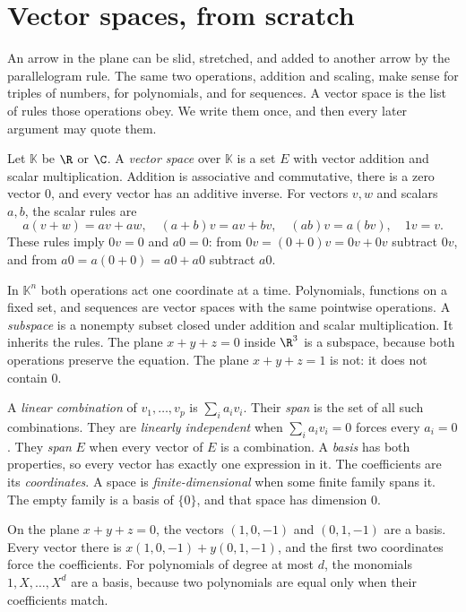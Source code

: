 \section{Vector spaces, from scratch}

An arrow in the plane can be slid, stretched, and added to another arrow by the parallelogram rule. The same two operations, addition and scaling, make sense for triples of numbers, for polynomials, and for sequences. A vector space is the list of rules those operations obey. We write them once, and then every later argument may quote them.

\begin{definitionx}
Let $\mathbb K$ be $\R$ or $\C$. A \emph{vector space} over $\mathbb K$ is a set $E$ with vector addition and scalar multiplication. Addition is associative and commutative, there is a zero vector $0$, and every vector has an additive inverse. For vectors $v,w$ and scalars $a,b$, the scalar rules are
\[
a(v+w)=av+aw,\quad (a+b)v=av+bv,\quad (ab)v=a(bv),\quad 1v=v.
\]
These rules imply $0v=0$ and $a0=0$: from $0v=(0+0)v=0v+0v$ subtract $0v$, and from $a0=a(0+0)=a0+a0$ subtract $a0$.
\end{definitionx}

In $\mathbb K^n$ both operations act one coordinate at a time. Polynomials, functions on a fixed set, and sequences are vector spaces with the same pointwise operations. A \emph{subspace} is a nonempty subset closed under addition and scalar multiplication. It inherits the rules. The plane $x+y+z=0$ inside $\R^3$ is a subspace, because both operations preserve the equation. The plane $x+y+z=1$ is not: it does not contain $0$.

A \emph{linear combination} of $v_1,\dots,v_p$ is $\sum_i a_iv_i$. Their \emph{span} is the set of all such combinations. They are \emph{linearly independent} when $\sum_i a_iv_i=0$ forces every $a_i=0$. They \emph{span} $E$ when every vector of $E$ is a combination. A \emph{basis} has both properties, so every vector has exactly one expression in it. The coefficients are its \emph{coordinates}. A space is \emph{finite-dimensional} when some finite family spans it. The empty family is a basis of $\{0\}$, and that space has dimension $0$.

On the plane $x+y+z=0$, the vectors $(1,0,-1)$ and $(0,1,-1)$ are a basis. Every vector there is $x(1,0,-1)+y(0,1,-1)$, and the first two coordinates force the coefficients. For polynomials of degree at most $d$, the monomials $1,X,\dots,X^d$ are a basis, because two polynomials are equal only when their coefficients match.

